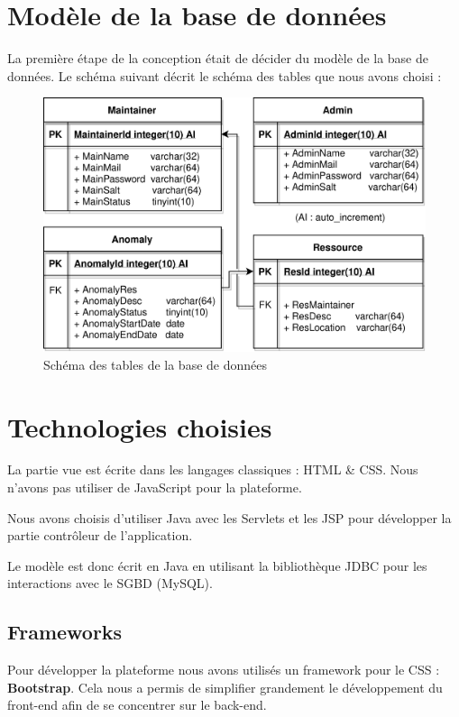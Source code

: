 \section{Modèle de la base de données}
La première étape de la conception était de décider du modèle de la base de données. Le schéma
suivant décrit le schéma des tables que nous avons choisi :\newline

\begin{figure}[!h]
    \centering
    \includegraphics[width=\textwidth]{img/schemaSQL.png}
    \caption{Schéma des tables de la base de données}
    \label{fig:schemaSQL}
\end{figure}
\newpage

\section{Technologies choisies}
La partie vue est écrite dans les langages classiques : HTML \& CSS. Nous n'avons pas utiliser
de JavaScript pour la plateforme.\newline

Nous avons choisis d'utiliser Java avec les Servlets et les JSP pour développer la partie
contrôleur de l'application.\newline

Le modèle est donc écrit en Java en utilisant la bibliothèque JDBC pour les interactions avec
le SGBD (MySQL).

\subsection{Frameworks}
Pour développer la plateforme nous avons utilisés un framework pour le CSS :
\textbf{Bootstrap}.
Cela nous a permis de simplifier grandement le développement du front-end afin de se concentrer
sur le back-end.

